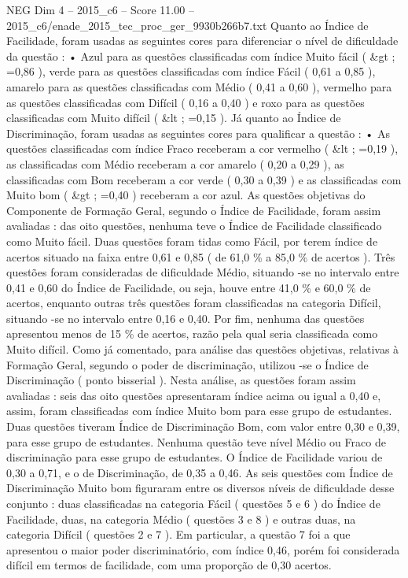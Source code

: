 \begin{textsample}{NEG Dim 4 – 2015\_c6 – Score 11.00 – 2015\_c6/enade\_2015\_tec\_proc\_ger\_9930b266b7.txt}
Quanto ao Índice de Facilidade, foram usadas as seguintes cores para diferenciar o nível de dificuldade da questão : • Azul para as questões classificadas com índice Muito fácil ( \&gt ; =0,86 ), verde para as questões classificadas com índice Fácil ( 0,61 a 0,85 ), amarelo para as questões classificadas com Médio ( 0,41 a 0,60 ), vermelho para as questões classificadas com Difícil ( 0,16 a 0,40 ) e roxo para as questões classificadas com Muito difícil ( \&lt ; =0,15 ).
Já quanto ao Índice de Discriminação, foram usadas as seguintes cores para qualificar a questão : • As questões classificadas com índice Fraco receberam a cor vermelho ( \&lt ; =0,19 ), as classificadas com Médio receberam a cor amarelo ( 0,20 a 0,29 ), as classificadas com Bom receberam a cor verde ( 0,30 a 0,39 ) e as classificadas com Muito bom ( \&gt ; =0,40 ) receberam a cor azul.
As questões objetivas do Componente de Formação Geral, segundo o Índice de Facilidade, foram assim avaliadas : das oito questões, nenhuma teve o Índice de Facilidade classificado como Muito fácil.
Duas questões foram tidas como Fácil, por terem índice de acertos situado na faixa entre 0,61 e 0,85 ( de 61,0 \% a 85,0 \% de acertos ).
Três questões foram consideradas de dificuldade Médio, situando -se no intervalo entre 0,41 e 0,60 do Índice de Facilidade, ou seja, houve entre 41,0 \% e 60,0 \% de acertos, enquanto outras três questões foram classificadas na categoria Difícil, situando -se no intervalo entre 0,16 e 0,40.
Por fim, nenhuma das questões apresentou menos de 15 \% de acertos, razão pela qual seria classificada como Muito difícil.
Como já comentado, para análise das questões objetivas, relativas à Formação Geral, segundo o poder de discriminação, utilizou -se o Índice de Discriminação ( ponto bisserial ).
Nesta análise, as questões foram assim avaliadas : seis das oito questões apresentaram índice acima ou igual a 0,40 e, assim, foram classificadas com índice Muito bom para esse grupo de estudantes.
Duas questões tiveram Índice de Discriminação Bom, com valor entre 0,30 e 0,39, para esse grupo de estudantes.
Nenhuma questão teve nível Médio ou Fraco de discriminação para esse grupo de estudantes.
O Índice de Facilidade variou de 0,30 a 0,71, e o de Discriminação, de 0,35 a 0,46.
As seis questões com Índice de Discriminação Muito bom figuraram entre os diversos níveis de dificuldade desse conjunto : duas classificadas na categoria Fácil ( questões 5 e 6 ) do Índice de Facilidade, duas, na categoria Médio ( questões 3 e 8 ) e outras duas, na categoria Difícil ( questões 2 e 7 ).
Em particular, a questão 7 foi a que apresentou o maior poder discriminatório, com índice 0,46, porém foi considerada difícil em termos de facilidade, com uma proporção de 0,30 acertos.

\end{textsample}
